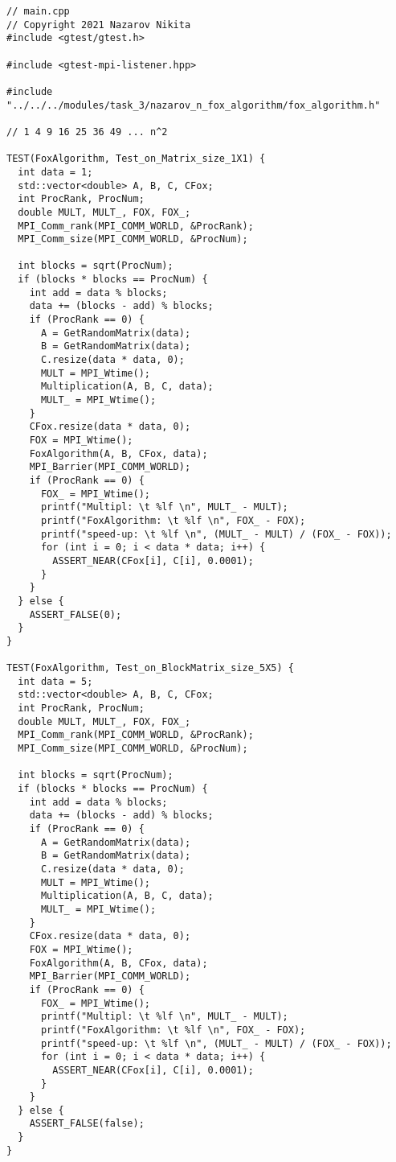 \documentclass{report}
\begin{document}
\newpage
\begin{lstlisting}
// main.cpp
// Copyright 2021 Nazarov Nikita
#include <gtest/gtest.h>

#include <gtest-mpi-listener.hpp>

#include "../../../modules/task_3/nazarov_n_fox_algorithm/fox_algorithm.h"

// 1 4 9 16 25 36 49 ... n^2

TEST(FoxAlgorithm, Test_on_Matrix_size_1X1) {
  int data = 1;
  std::vector<double> A, B, C, CFox;
  int ProcRank, ProcNum;
  double MULT, MULT_, FOX, FOX_;
  MPI_Comm_rank(MPI_COMM_WORLD, &ProcRank);
  MPI_Comm_size(MPI_COMM_WORLD, &ProcNum);

  int blocks = sqrt(ProcNum);
  if (blocks * blocks == ProcNum) {
    int add = data % blocks;
    data += (blocks - add) % blocks;
    if (ProcRank == 0) {
      A = GetRandomMatrix(data);
      B = GetRandomMatrix(data);
      C.resize(data * data, 0);
      MULT = MPI_Wtime();
      Multiplication(A, B, C, data);
      MULT_ = MPI_Wtime();
    }
    CFox.resize(data * data, 0);
    FOX = MPI_Wtime();
    FoxAlgorithm(A, B, CFox, data);
    MPI_Barrier(MPI_COMM_WORLD);
    if (ProcRank == 0) {
      FOX_ = MPI_Wtime();
      printf("Multipl: \t %lf \n", MULT_ - MULT);
      printf("FoxAlgorithm: \t %lf \n", FOX_ - FOX);
      printf("speed-up: \t %lf \n", (MULT_ - MULT) / (FOX_ - FOX));
      for (int i = 0; i < data * data; i++) {
        ASSERT_NEAR(CFox[i], C[i], 0.0001);
      }
    }
  } else {
    ASSERT_FALSE(0);
  }
}

TEST(FoxAlgorithm, Test_on_BlockMatrix_size_5X5) {
  int data = 5;
  std::vector<double> A, B, C, CFox;
  int ProcRank, ProcNum;
  double MULT, MULT_, FOX, FOX_;
  MPI_Comm_rank(MPI_COMM_WORLD, &ProcRank);
  MPI_Comm_size(MPI_COMM_WORLD, &ProcNum);

  int blocks = sqrt(ProcNum);
  if (blocks * blocks == ProcNum) {
    int add = data % blocks;
    data += (blocks - add) % blocks;
    if (ProcRank == 0) {
      A = GetRandomMatrix(data);
      B = GetRandomMatrix(data);
      C.resize(data * data, 0);
      MULT = MPI_Wtime();
      Multiplication(A, B, C, data);
      MULT_ = MPI_Wtime();
    }
    CFox.resize(data * data, 0);
    FOX = MPI_Wtime();
    FoxAlgorithm(A, B, CFox, data);
    MPI_Barrier(MPI_COMM_WORLD);
    if (ProcRank == 0) {
      FOX_ = MPI_Wtime();
      printf("Multipl: \t %lf \n", MULT_ - MULT);
      printf("FoxAlgorithm: \t %lf \n", FOX_ - FOX);
      printf("speed-up: \t %lf \n", (MULT_ - MULT) / (FOX_ - FOX));
      for (int i = 0; i < data * data; i++) {
        ASSERT_NEAR(CFox[i], C[i], 0.0001);
      }
    }
  } else {
    ASSERT_FALSE(false);
  }
}


\end{lstlisting}
\end{document}
